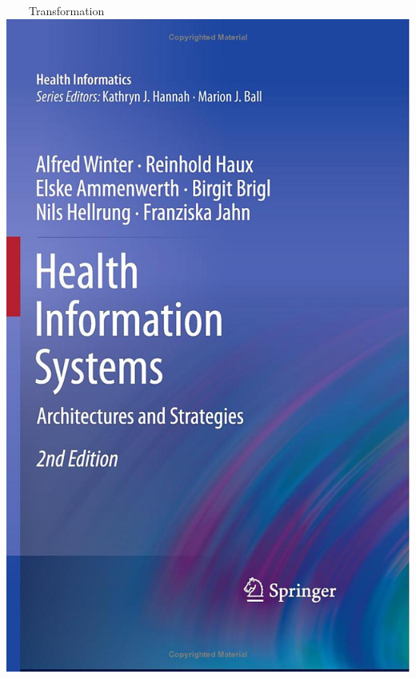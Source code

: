 \documentclass[aspectratio=1610,12pt]{beamer}
\begin{document}
\begin{frame}[plain]{~~~~Transformation}
\centering\includegraphics[height=0.21\textheight,keepaspectratio]{img/book-bb.jpg}

\end{frame}
\end{document}
